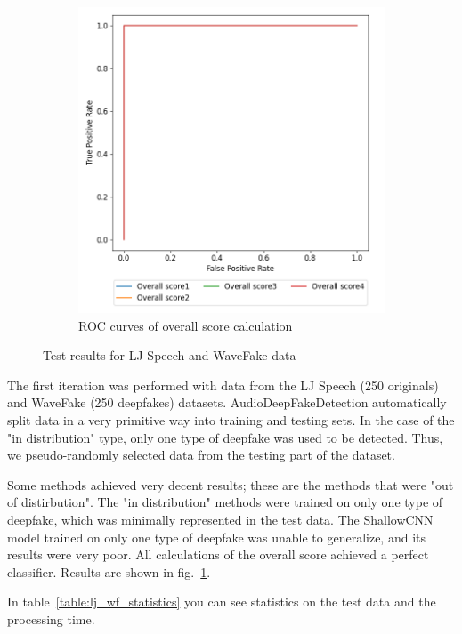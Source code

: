 \begin{figure}[H]
\begin{subfigure}[h]{0.5\linewidth}
        \includegraphics[width=1\linewidth]{other-fig/tests/lj_wf_overall_score.png}
        \caption{ROC curves of overall score calculation}
    \end{subfigure}
    \caption{Test results for LJ Speech and WaveFake data}
    \label{fig:lj_wf_results}
\end{figure}

The first iteration was performed with data from the LJ Speech (250 originals) and WaveFake (250 deepfakes) datasets. AudioDeepFakeDetection automatically split data in a very primitive way into training and testing sets. In the case of the "in distribution" type, only one type of deepfake was used to be detected. Thus, we pseudo-randomly selected data from the testing part of the dataset.

Some methods achieved very decent results; these are the methods that were "out of distirbution". The "in distribution" methods were trained on only one type of deepfake, which was minimally represented in the test data. The ShallowCNN model trained on only one type of deepfake was unable to generalize, and its results were very poor. All calculations of the overall score achieved a perfect classifier. Results are shown in fig.~\ref{fig:lj_wf_results}.

In table~\ref{table:lj_wf_statistics} you can see statistics on the test data and the processing time.

